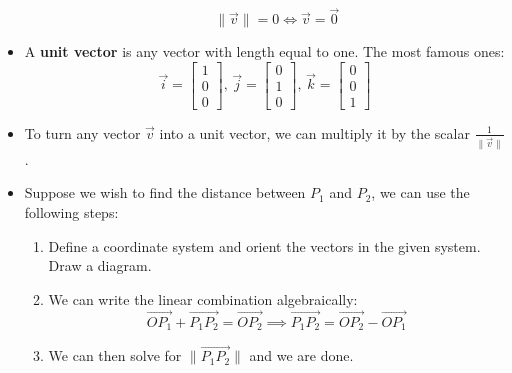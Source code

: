 \begin{itemize}
\begin{itemize}
        \begin{equation}
            \lVert \vec{v} \rVert = 0 \iff \vec{v}=\vec{0}
            \label{eq:}
        \end{equation}
    \end{itemize}
\item A \textbf{unit vector} is any vector with length equal to one. The most famous ones:
    \begin{equation}
        \vec{i}= \begin{bmatrix}
            1\\0\\0
        \end{bmatrix} ,\,
        \vec{j}=\begin{bmatrix}
            0\\1\\0
        \end{bmatrix},\,
        \vec{k}=\begin{bmatrix}
            0\\0\\1
        \end{bmatrix}
    \end{equation}
    \item To turn any vector $\vec{v}$ into a unit vector, we can multiply it by the scalar $\frac{1}{\lVert \vec{v} \rVert}$.
    \item Suppose we wish to find the distance between $P_1$ and $P_2$, we can use the following steps:
    \begin{enumerate}
        \item Define a coordinate system and orient the vectors in the given system. Draw a diagram.
        \item We can write the linear combination algebraically:
        \begin{equation}
            \overrightarrow{OP_1}+\overrightarrow{P_1P_2} = \overrightarrow{OP_2} \implies \overrightarrow{P_1P_2}=\overrightarrow{OP_2}-\overrightarrow{OP_1}
            \label{eq:}
        \end{equation}
        \item We can then solve for $\lVert\overrightarrow{P_1P_2}\rVert$ and we are done.
    \end{enumerate}
\end{itemize}
